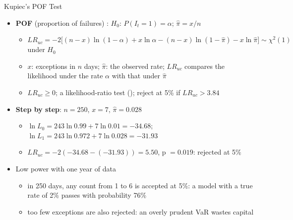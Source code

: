 \begin{frame}{Kupiec's POF Test}
\itemsize{\footnotesize}
\begin{itemize}
    \item \textbf{POF} (proportion of failures) : $H_0$: $P(I_t = 1) = \alpha$; $\hat\pi = x/n$
    \begin{itemize}
        \item $LR_{uc} = -2\big[(n - x)\ln(1 - \alpha) + x\ln\alpha - (n - x)\ln(1 - \hat\pi) - x\ln\hat\pi\big] \sim \chi^2(1)$ under $H_0$
        \item $x$: exceptions in $n$ days; $\hat\pi$: the observed rate; $LR_{uc}$ compares the likelihood under the rate $\alpha$ with that under $\hat\pi$
        \item $LR_{uc} \ge 0$; a likelihood-ratio test (); reject at 5\% if $LR_{uc} > 3.84$
    \end{itemize}
    \item \textbf{Step by step}: $n = 250$, $x = 7$, $\hat\pi = 0.028$
    \begin{itemize}
        \item $\ln L_0 = 243\ln 0.99 + 7\ln 0.01 = -34.68$; $\ln L_1 = 243\ln 0.972 + 7\ln 0.028 = -31.93$
        \item $LR_{uc} = -2(-34.68 - (-31.93)) = 5.50$, p $= 0.019$: rejected at 5\%
    \end{itemize}
    \item Low power with one year of data
    \begin{itemize}
        \item in 250 days, any count from 1 to 6 is accepted at 5\%: a model with a true rate of 2\% passes with probability 76\%
        \item too few exceptions are also rejected: an overly prudent VaR wastes capital
    \end{itemize}
\end{itemize}
\end{frame}


